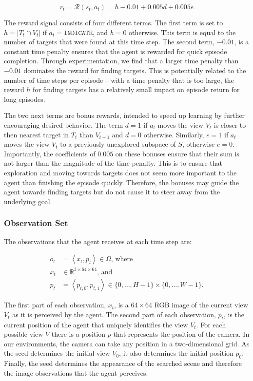 \begin{equation}
    r_t = \mathcal{R}(s_t, a_t) = h - 0.01 + 0.005d + 0.005e
\end{equation}

The reward signal consists of four different terms.
The first term is set to \(h = \left\lvert T_t \cap V_t \right\rvert\) if \(a_t = \mathtt{INDICATE}\), and \(h = 0\) otherwise.
This term is equal to the number of targets that were found at this time step.
The second term, \(-0.01\), is a constant time penalty ensures that the agent is rewarded for quick episode completion.
Through experimentation, we find that a larger time penalty than \(-0.01\) dominates the reward for finding targets.
This is potentially related to the number of time steps per episode -- with a time penalty that is too large, the reward \(h\) for finding targets has a relatively small impact on episode return for long episodes.

The two next terms are bonus rewards, intended to speed up learning by further encouraging desired behavior.
The term \(d = 1\) if \(a_t\) moves the view \(V_t\) is closer to then nearest target in \(T_t\) than \(V_{t-1}\) and \(d = 0\) otherwise.
Similarly, \(e = 1\) if \(a_t\) moves the view \(V_t\) to a previously unexplored subspace of \(S\), otherwise \(e = 0\).
Importantly, the coefficients of \(0.005\) on these bonuses ensure that their sum is not larger than the magnitude of the time penalty.
This is to ensure that exploration and moving towards targets does not seem more important to the agent than finishing the episode quickly.
Therefore, the bonuses may guide the agent towards finding targets but do not cause it to steer away from the underlying goal.

\subsubsection{Observation Set}

The observations that the agent receives at each time step are:

\begin{align}
    o_t & = \left\langle x_t, p_t \right\rangle \in \Omega \text{, where} \\
    x_t & \in \mathbb{R}^{3 \times 64 \times 64} \text{, and} \\
    p_t & = \left\langle p_{t,0}, p_{t,1} \right\rangle \in \{0, \dots, H-1\} \times \{0, \dots, W-1\}.
\end{align}

The first part of each observation, \(x_t\), is a \(64 \times 64\) RGB image of the current view \(V_t\) as it is perceived by the agent.
The second part of each observation, \(p_t\), is the current position of the agent that uniquely identifies the view \(V_t\).
For each possible view \(V\) there is a position \(p\) that represents the position of the camera.
In our environments, the camera can take any position in a two-dimensional grid. 
As the seed determines the initial view \(V_0\), it also determines the initial position \(p_0\).
Finally, the seed determines the appearance of the searched scene and therefore the image observations that the agent perceives.

